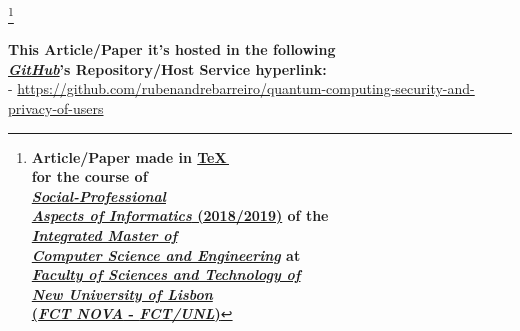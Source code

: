 \documentclass[conference]{IEEEtran}
\begin{document}
\begin{center}
    \thanks{
        \small{
            \textbf{Article/Paper made in \href{http://tug.org/}{\TeX\,} \\
            for the course of\\
            \href{https://sites.google.com/campus.fct.unl.pt/aspi-2019}{\textit{Social-Professional\\Aspects of Informatics} (2018/2019)} of the\\
            \href{https://www.fct.unl.pt/en/education/course/integrated-master-computer-science}{\textit{Integrated Master of}\\
            \textit{Computer Science and Engineering}} at\\
            \href{https://www.fct.unl.pt/}{\textit{Faculty of Sciences and Technology of}\\
            \textit{New University of Lisbon}\\
            (\textit{FCT NOVA} - \textit{FCT/UNL})}}}
        }
\end{center}

\vspace{4pt}

\begin{center}
    \small{
        \textbf{
            This Article/Paper it's hosted in the following \\ \href{https://github.com/}{\textit{GitHub}}'s Repository/Host Service hyperlink:
        }\\
        \vspace{3pt}
        - \href{https://github.com/rubenandrebarreiro/quantum-computing-security-and-privacy-of-users}{https://github.com/rubenandrebarreiro/quantum-computing-security-and-privacy-of-users}
    }
\end{center}
\end{document}
